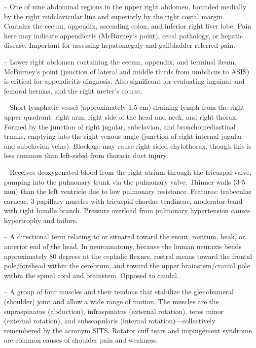 -- One of nine abdominal regions in the upper right abdomen, bounded medially by the right midclavicular line and superiorly by the right costal margin. Contains the cecum, appendix, ascending colon, and inferior right liver lobe. Pain here may indicate appendicitis (McBurney's point), cecal pathology, or hepatic disease. Important for assessing hepatomegaly and gallbladder referred pain.

-- Lower right abdomen containing the cecum, appendix, and terminal ileum. McBurney's point (junction of lateral and middle thirds from umbilicus to ASIS) is critical for appendicitis diagnosis. Also significant for evaluating inguinal and femoral hernias, and the right ureter's course.

-- Short lymphatic vessel (approximately 1.5 cm) draining lymph from the right upper quadrant: right arm, right side of the head and neck, and right thorax. Formed by the junction of right jugular, subclavian, and bronchomediastinal trunks, emptying into the right venous angle (junction of right internal jugular and subclavian veins). Blockage may cause right-sided chylothorax, though this is less common than left-sided from thoracic duct injury.

-- Receives deoxygenated blood from the right atrium through the tricuspid valve, pumping into the pulmonary trunk via the pulmonary valve. Thinner walls (3-5 mm) than the left ventricle due to low pulmonary resistance. Features: trabeculae carneae, 3 papillary muscles with tricuspid chordae tendineae, moderator band with right bundle branch. Pressure overload from pulmonary hypertension causes hypertrophy and failure.

-- A directional term relating to or situated toward the snout, rostrum, beak, or anterior end of the head. In neuroanatomy, because the human neuraxis bends approximately 80 degrees at the cephalic flexure, rostral means toward the frontal pole/forehead within the cerebrum, and toward the upper brainstem/cranial pole within the spinal cord and brainstem. Opposed to caudal.

-- A group of four muscles and their tendons that stabilize the glenohumeral (shoulder) joint and allow a wide range of motion. The muscles are the supraspinatus (abduction), infraspinatus (external rotation), teres minor (external rotation), and subscapularis (internal rotation)—collectively remembered by the acronym SITS. Rotator cuff tears and impingement syndrome are common causes of shoulder pain and weakness.

